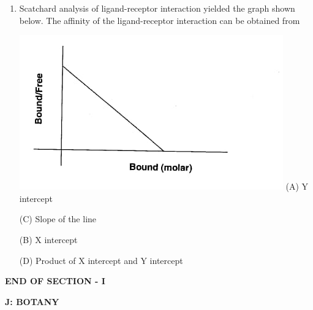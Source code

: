\documentclass[journal]{IEEEtran}
\begin{document}
\begin{enumerate}
\begin{minipage}{0.5\textwidth}
\begin{flushleft}
S) Tyrosine oxidation

		\end{flushleft}
		\end{minipage}
	\begin{minipage}{0.5\textwidth}
		\begin{flushleft}
Group II
1) Thyroxine


2) T cell Receptor


3) DOPA


4) Estradiol receptor

5) Epinephrine

6) Melanin

7) Endorphin

8) Serotonin
		\end{flushleft}
		\end{minipage}


(A) P1, Q-6. R-5, S-4

(B) P-5, Q-7, R-4, 8-8

(C) P-2, Q-5, R-3, S-4

(D) P-3. Q-1, R-2, S-6

\item {Scatchard analysis of ligand-receptor interaction yielded the graph shown below. The affinity of the ligand-receptor interaction can be obtained from

	\includegraphics[width=\textwidth]{5}
(A) Y intercept

(C) Slope of the line

(B) X intercept

(D) Product of X intercept and Y intercept
}
\end{enumerate}

\begin{center}
\textbf{END OF SECTION - I}
\end{center}
\newpage
\textbf{J: BOTANY}
\end{document}
